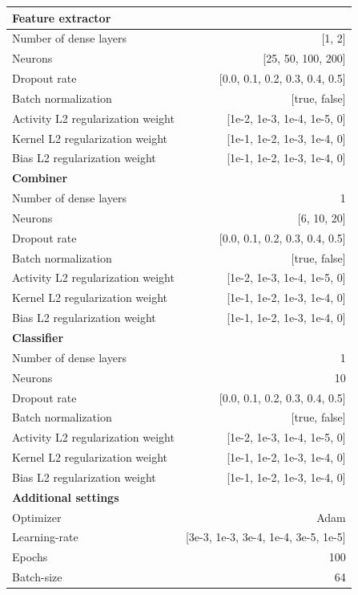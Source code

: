 \documentclass[preprint]{elsarticle}
\begin{document}
\renewcommand{\arraystretch}{1.2}
\begin{table}[H]
  \centering
  \scriptsize
\begin{adjustbox}{center}
\begin{tabular}{@{}lr@{}}
\toprule
\textbf{Feature extractor}  & \\
\midrule
{Number of dense layers}    & [1, 2] \\
{Neurons}                   & [25, 50, 100, 200] \\
{Dropout rate}              & [0.0, 0.1, 0.2, 0.3, 0.4, 0.5] \\
{Batch normalization}       & [true, false] \\
{Activity L2 regularization weight}   & [1e-2, 1e-3, 1e-4, 1e-5, 0] \\
{Kernel L2 regularization weight}     & [1e-1, 1e-2, 1e-3, 1e-4, 0] \\
{Bias L2 regularization weight}       & [1e-1, 1e-2, 1e-3, 1e-4, 0] \\
\midrule
\textbf{Combiner}           & \\
\midrule
{Number of dense layers}    & 1 \\
{Neurons}                   & [6, 10, 20] \\
{Dropout rate}                  & [0.0, 0.1, 0.2, 0.3, 0.4, 0.5] \\
{Batch normalization}       & [true, false] \\
{Activity L2 regularization weight}   & [1e-2, 1e-3, 1e-4, 1e-5, 0] \\
{Kernel L2 regularization weight}     & [1e-1, 1e-2, 1e-3, 1e-4, 0] \\
{Bias L2 regularization weight}       & [1e-1, 1e-2, 1e-3, 1e-4, 0] \\
\midrule
\textbf{Classifier}         & \\
\midrule
{Number of dense layers}    & 1 \\
{Neurons}                   & 10 \\
{Dropout rate}                  & [0.0, 0.1, 0.2, 0.3, 0.4, 0.5] \\
{Batch normalization}       & [true, false] \\
{Activity L2 regularization weight}   & [1e-2, 1e-3, 1e-4, 1e-5, 0] \\
{Kernel L2 regularization weight}     & [1e-1, 1e-2, 1e-3, 1e-4, 0] \\
{Bias L2 regularization weight}       & [1e-1, 1e-2, 1e-3, 1e-4, 0] \\
\midrule
\textbf{Additional settings} & \\
\midrule
Optimizer                   & Adam \\
Learning-rate               & [3e-3, 1e-3, 3e-4, 1e-4, 3e-5, 1e-5] \\
Epochs                      & 100 \\
Batch-size                  & 64 \\


\end{tabular}
\end{adjustbox}
\end{table}
\end{document}
